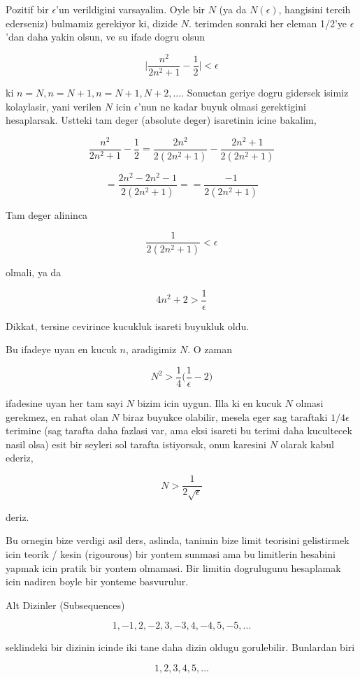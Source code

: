 \documentclass[12pt,fleqn]{article}
\begin{document}
Pozitif bir $\epsilon$'un verildigini varsayalim. Oyle bir $N$ (ya da
$N(\epsilon)$, hangisini tercih ederseniz) bulmamiz gerekiyor ki, dizide
$N$. terimden sonraki her eleman 1/2'ye $\epsilon$'dan daha yakin olsun, ve
su ifade dogru olsun

\[ 
\bigg|\frac{n^2}{2n^2+1} - \frac{1}{2}\bigg| < \epsilon
 \]

ki $n=N,n=N+1,n=N+1,N+2,...$. Sonuctan geriye dogru gidersek isimiz
kolaylasir, yani verilen $N$ icin $\epsilon$'nun ne kadar buyuk olmasi
gerektigini hesaplarsak. Ustteki tam deger (absolute deger) isaretinin 
icine bakalim, 

\[ 
\frac{n^2}{2n^2+1}  - \frac{1}{2} = 
\frac{2n^2}{2(2n^2+1)}  - \frac{2n^2+1}{2(2n^2+1)} 
 \]

\[  
= \frac{2n^2 - 2n^2 - 1}{2(2n^2+1)} = 
= \frac{- 1}{2(2n^2+1)} 
\]

Tam deger alininca 

\[  \frac{1}{2(2n^2+1)} < \epsilon\]

olmali, ya da

\[ 4n^2 + 2 > \frac{1}{\epsilon} \]

Dikkat, tersine cevirince kucukluk isareti buyukluk oldu. 

Bu ifadeye uyan en kucuk $n$, aradigimiz $N$. O zaman 

\[ N^2 > \frac{1}{4}\bigg(\frac{1}{\epsilon} - 2\bigg) \]

ifadesine uyan her tam sayi $N$ bizim icin uygun. Illa ki en kucuk $N$
olmasi gerekmez, en rahat olan $N$ biraz buyukce olabilir, mesela eger sag
taraftaki $1/4\epsilon$ terimine (sag tarafta daha fazlasi var, ama eksi
isareti bu terimi daha kucultecek nasil olsa) esit bir seyleri sol tarafta
istiyorsak, onun karesini $N$ olarak kabul ederiz,

\[ N > \frac{1}{2\sqrt{\epsilon}} \]

deriz. 

Bu ornegin bize verdigi asil ders, aslinda, tanimin bize limit teorisini
gelistirmek icin teorik / kesin (rigourous) bir yontem sunmasi ama bu
limitlerin hesabini yapmak icin pratik bir yontem olmamasi. Bir limitin
dogrulugunu hesaplamak icin nadiren boyle bir yonteme basvurulur. 

Alt Dizinler (Subsequences) 

\[ 1, -1, 2, -2, 3, -3, 4, -4, 5, -5, . . . \]

seklindeki bir dizinin icinde iki tane daha dizin oldugu
gorulebilir. Bunlardan biri

\[ 1, 2, 3, 4, 5, ... \]
\end{document}
